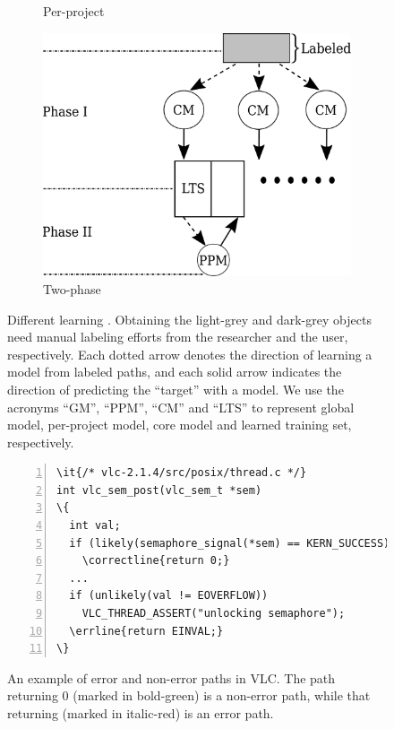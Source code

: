 \documentclass[12pt]{report}	%
\begin{document}
\begin{figure}[t]
\begin{subfigure}[b]{0.3\textwidth}
    \caption{Per-project \paradigm}
    \label{fig:mmodels:pproject}
\end{subfigure}%
\hfill
\begin{subfigure}[b]{0.4\textwidth}
	\centering
    \includegraphics[width=.9\linewidth]{images/two-phase.pdf}
    \caption{Two-phase \paradigm}
    \label{fig:mmodels:tphase}
\end{subfigure}
\caption{Different learning . 
Obtaining the light-grey and dark-grey objects 
need manual labeling efforts from the researcher and the user, respectively.
Each dotted arrow denotes the direction of learning a model from labeled paths,
and each solid arrow indicates the direction of predicting the ``target'' with a model.
We use the acronyms ``GM'', ``PPM'', ``CM'' and ``LTS'' to represent
global model, per-project model, core model and learned training set, respectively.
}
\label{fig:mmodels}
\end{figure}

\begin{figure}[t]
\begin{Verbatim}[numbers=left,xleftmargin=6mm,fontsize=\footnotesize,
    commandchars=\\\{\}]
\it{/* vlc-2.1.4/src/posix/thread.c */}
int vlc_sem_post(vlc_sem_t *sem)
\{
  int val;
  if (likely(semaphore_signal(*sem) == KERN_SUCCESS))
    \correctline{return 0;}
  ...
  if (unlikely(val != EOVERFLOW))
    VLC_THREAD_ASSERT("unlocking semaphore");
  \errline{return EINVAL;}
\}
\end{Verbatim}
\caption{An example of error and non-error paths in VLC.
The path returning 0 (marked in bold-green) is a non-error path, 
while that returning  (marked in italic-red) is an error path.
}
\label{fig:unifeature-exam}
\end{figure}
\end{document}
